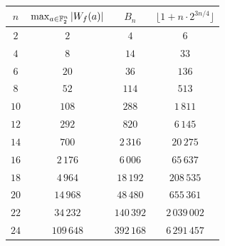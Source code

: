 \documentclass[11pt]{llncs}
\begin{document}

\begin{table}
	\centering
	\begin{tabular}{|c|c|c|c|}
		\hline
		$n$ & $\max_{a\in\mathbb{F}_2^n}|W_f(a)|$ & $B_n$  & $\lfloor 1+n \cdot 2^{3n/4} \rfloor$\\ \hline
		$2$  & $2$     & $4$  &  $6$ \\
		$4$  & $8$     & $14$  & $33$  \\
		$6$  & $20$    & $36$   & $136$\\
		$8$  & $52$    & $114$  & $513$ \\
		$10$ & $108$   & $288$  & $1\,811$\\
		$12$ & $292$   & $820$  & $6\,145$ \\
		$14$ & $700$   & $2\,316$ & $20\,275$ \\
		$16$ & $2\,176$  & $6\,006$ & $65\,637$ \\
		$18$ & $4\,964$  & $18\,192$ & $208\,535$ \\
		$20$ & $14\,968$ & $48\,480$ & $655\,361$ \\
		$22$ & $34\,232$ & $140\,392$ & $2\,039 \,002$ \\
		$24$ & $109\,648$ & $392\,168$ & $6\,291 \,457$  \\ \hline
	\end{tabular}
	\label{table:max_walsh_vs_bound}
\end{table}
\end{document}
